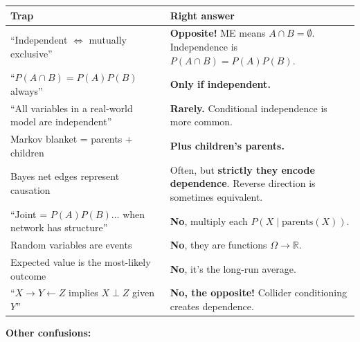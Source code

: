 \documentclass[11pt, a4paper]{article}
\newcommand{\thead}[1]{\textbf{#1}}
\begin{document}
\begin{trapbox}[summary]
\begin{tabular}{@{}p{6.5cm}p{8cm}@{}}
\toprule
\thead{Trap} & \thead{Right answer} \\
\midrule
``Independent $\Leftrightarrow$ mutually exclusive'' & \textbf{Opposite!} ME means $A \cap B = \emptyset$. Independence is $P(A \cap B) = P(A)P(B)$. \\
``$P(A \cap B) = P(A) P(B)$ always''               & \textbf{Only if independent.} \\
``All variables in a real-world model are independent'' & \textbf{Rarely.} Conditional independence is more common. \\
Markov blanket = parents + children                  & \textbf{Plus children's parents.} \\
Bayes net edges represent causation                   & Often, but \textbf{strictly they encode dependence}. Reverse direction is sometimes equivalent. \\
``Joint = $P(A) P(B) \dots$ when network has structure'' & \textbf{No}, multiply each $P(X \mid \mathrm{parents}(X))$. \\
Random variables are events                            & \textbf{No}, they are functions $\Omega \to \mathbb{R}$. \\
Expected value is the most-likely outcome              & \textbf{No}, it's the long-run average. \\
``$X \to Y \leftarrow Z$ implies $X \perp Z$ given $Y$'' & \textbf{No, the opposite!} Collider conditioning creates dependence. \\
\bottomrule
\end{tabular}
\end{trapbox}

\textbf{Other confusions:}
\end{document}
